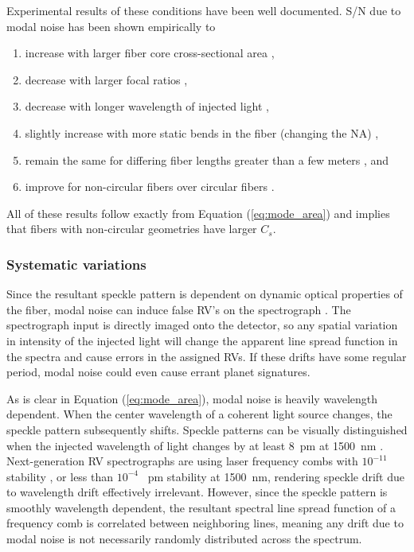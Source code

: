 \documentclass[11pt]{article}
\begin{document}
Experimental results of these conditions have been well documented. S/N due to modal noise has been shown empirically to
\begin{enumerate}
\item increase with larger fiber core cross-sectional area \citep{Lemke2010, Sablowski2016},
\item decrease with larger focal ratios \citep{Baudrand2001, Sablowski2016},
\item decrease with longer wavelength of injected light \citep{Baudrand2001},
\item slightly increase with more static bends in the fiber (changing the NA) \citep{Imai1979},
\item remain the same for differing fiber lengths greater than a few meters \citep{Baudrand2001}, and
\item improve for non-circular fibers over circular fibers \citep{Sablowski2016, Sturmer2016}.
\end{enumerate}
All of these results follow exactly from Equation (\ref{eq:mode_area}) and implies that fibers with non-circular geometries have larger $C_{s}$.

\subsubsection{Systematic variations}
\label{subsec:sys_var}

Since the resultant speckle pattern is dependent on dynamic optical properties of the fiber, modal noise can induce false RV's on the spectrograph \citep{Mahadevan2014}. The spectrograph input is directly imaged onto the detector, so any spatial variation in intensity of the injected light will change the apparent line spread function in the spectra and cause errors in the assigned RVs. If these drifts have some regular period, modal noise could even cause errant planet signatures.

As is clear in Equation (\ref{eq:mode_area}), modal noise is heavily wavelength dependent. When the center wavelength of a coherent light source changes, the speckle pattern subsequently shifts.  Speckle patterns can be visually distinguished when the injected wavelength of light changes by at least \SI{8}{\pico\meter} at \SI{1500}{\nano\meter} \citep{Redding2013}. Next-generation RV spectrographs are using laser frequency combs with $10^{-11}$ stability \citep{Probst2014}, or less than $10^{-4}$ \SI{}{\pico\meter} stability at \SI{1500}{\nano\meter}, rendering speckle drift due to wavelength drift effectively irrelevant. However, since the speckle pattern is smoothly wavelength dependent, the resultant spectral line spread function of a frequency comb is correlated between neighboring lines, meaning any drift due to modal noise is not necessarily randomly distributed across the spectrum.
\end{document}
